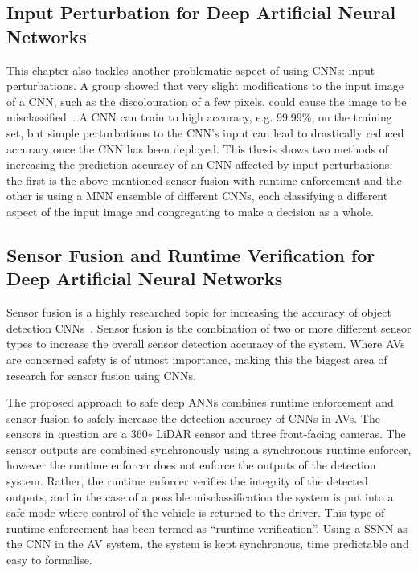 \subsection{Input Perturbation for Deep Artificial Neural Networks}
This chapter also tackles another problematic aspect of using \acp{CNN}: input perturbations.
A group showed that very slight modifications to the input image of a \acf{CNN}, such as the discolouration of a few pixels, could cause the image to be misclassified~\cite{Gehr2018AI2SA}.
A \ac{CNN} can train to high accuracy, e.g. 99.99\%, on the training set, but simple perturbations to the \ac{CNN}'s input can lead to drastically reduced accuracy once the \ac{CNN} has been deployed.
This thesis shows two methods of increasing the prediction accuracy of an \ac{CNN} affected by input perturbations: the first is the above-mentioned sensor fusion with runtime enforcement and the other is using a \acf{MNN} ensemble of different \acp{CNN}, each classifying a different aspect of the input image and congregating to make a decision as a whole.


\subsection{Sensor Fusion and Runtime Verification for Deep Artificial Neural Networks}
Sensor fusion is a highly researched topic for increasing the accuracy of object detection \acp{CNN}~\cite{SensorFusion2017}. 
Sensor fusion is the combination of two or more different sensor types to increase the overall sensor detection accuracy of the system.
Where \acfp{AV} are concerned safety is of utmost importance, making this the biggest area of research for sensor fusion using \acp{CNN}.

The proposed approach to safe deep \acp{ANN} combines runtime enforcement and sensor fusion to safely increase the detection accuracy of \acp{CNN} in \acp{AV}.
The sensors in question are a 360$\circ$ \ac{LiDAR} sensor and three front-facing cameras.
The sensor outputs are combined synchronously using a synchronous runtime enforcer, however the runtime enforcer does not enforce the outputs of the detection system.
Rather, the runtime enforcer verifies the integrity of the detected outputs, and in the case of a possible misclassification the system is put into a safe mode where control of the vehicle is returned to the driver.
This type of runtime enforcement has been termed as ``runtime verification''.
Using a \acf{SSNN} as the \ac{CNN} in the \ac{AV} system, the system is kept synchronous, time predictable and easy to formalise.

